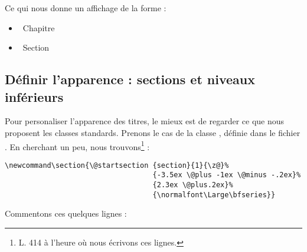 Ce qui nous donne un affichage de la forme :


\begin{itemize}
\item\thechapter~Chapitre 
\item\thesection~Section
\end{itemize}


\renewcommand \thechapter {\oldthechapter}
\renewcommand \thesection {\oldthesection}


\subsection{Définir l'apparence : sections et niveaux inférieurs}

Pour personaliser l'apparence des titres, le mieux est de regarder ce que nous proposent les classes standards. Prenons le cas de la classe , définie dans le fichier . En cherchant un peu, nous trouvons\footnote{L. 414 à l'heure où nous écrivons ces lignes.} :

\begin{verbatim}
\newcommand\section{\@startsection {section}{1}{\z@}%
                                   {-3.5ex \@plus -1ex \@minus -.2ex}%
                                   {2.3ex \@plus.2ex}%
                                   {\normalfont\Large\bfseries}}
\end{verbatim}

Commentons ces quelques lignes :

